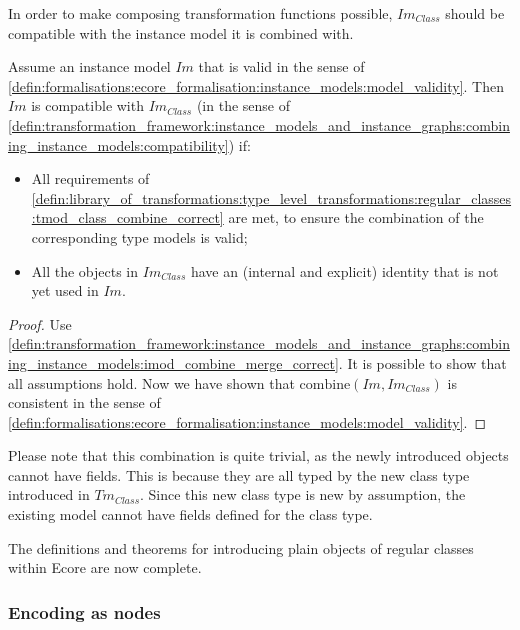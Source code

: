 In order to make composing transformation functions possible, $Im_{Class}$ should be compatible with the instance model it is combined with.

\begin{thm}
\label{defin:library_of_transformations:instance_level_transformations:plain_objects:imod_class_combine_correct}
Assume an instance model $Im$ that is valid in the sense of \cref{defin:formalisations:ecore_formalisation:instance_models:model_validity}. Then $Im$ is compatible with $Im_{Class}$ (in the sense of \cref{defin:transformation_framework:instance_models_and_instance_graphs:combining_instance_models:compatibility}) if:
\begin{itemize}
    \item All requirements of \cref{defin:library_of_transformations:type_level_transformations:regular_classes:tmod_class_combine_correct} are met, to ensure the combination of the corresponding type models is valid;
    \item All the objects in $Im_{Class}$ have an (internal and explicit) identity that is not yet used in $Im$.
\end{itemize}
\end{thm}

\begin{proof}
Use \cref{defin:transformation_framework:instance_models_and_instance_graphs:combining_instance_models:imod_combine_merge_correct}. It is possible to show that all assumptions hold. Now we have shown that $\mathrm{combine}(Im, Im_{Class})$ is consistent in the sense of \cref{defin:formalisations:ecore_formalisation:instance_models:model_validity}.
\end{proof}

Please note that this combination is quite trivial, as the newly introduced objects cannot have fields. This is because they are all typed by the new class type introduced in $Tm_{Class}$. Since this new class type is new by assumption, the existing model cannot have fields defined for the class type.

The definitions and theorems for introducing plain objects of regular classes within Ecore are now complete. 

\subsubsection{Encoding as nodes}

